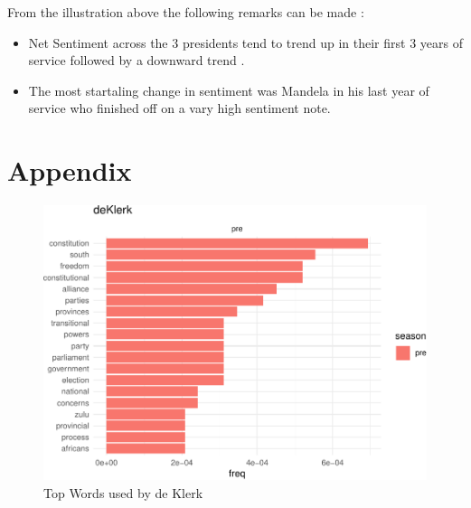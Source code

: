 \documentclass[]{article}
\begin{document}
From the illustration above the following remarks can be made :

\begin{itemize}
\item Net Sentiment across the 3 presidents tend to trend up in their first 3 years of service followed by a downward trend .
\item The most startaling change in sentiment was Mandela in his last year of service who finished off on a vary high sentiment note.
\end{itemize}

\section{Appendix}\label{appendix}

\begin{figure}[H]

{\centering \includegraphics{datasci_fi_Assignment_2_files/figure-latex/deKlerk -1} 

}

\caption{Top Words used by de Klerk}\label{fig:deKlerk }
\end{figure}
\end{document}
